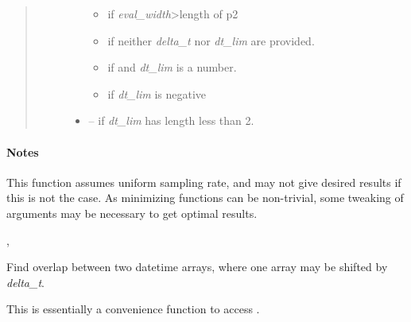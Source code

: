 \documentclass[letterpaper,10pt,english]{sphinxhowto}
\begin{document}
\begin{fulllineitems}
\begin{quote}
\begin{description}
\begin{itemize}
\begin{itemize}
\item {} 
if \emph{eval\_width}\textgreater{}length of p2

\item {} 
if neither \emph{delta\_t} nor \emph{dt\_lim} are provided.

\item {} 
if  and \emph{dt\_lim} is a number.

\item {} 
if \emph{dt\_lim} is negative

\end{itemize}

\item {} 
 --
if \emph{dt\_lim} has length less than 2.

\end{itemize}

\end{description}\end{quote}
\paragraph{Notes}

This function assumes uniform sampling rate, and may not give
desired results if this is not the case. As minimizing functions
can be non-trivial, some tweaking of arguments may be necessary
to get optimal results.




{\hyperref[swtools_doc:swtools.align_param]{\emph{}}}, {\hyperref[swtools_doc:swtools.where_overlap]{\emph{}}}



\end{fulllineitems}


\begin{fulllineitems}
\label{swtools_doc:swtools.where_overlap}
Find overlap between two datetime arrays, where one array may be
shifted by \emph{delta\_t}.

This is essentially a convenience function to access
.

\end{fulllineitems}

\end{document}
